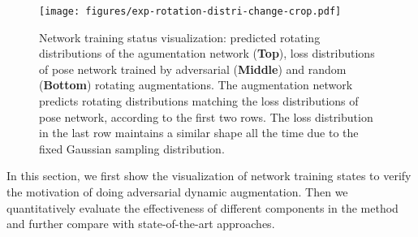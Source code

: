 \documentclass[10pt,twocolumn,letterpaper]{article}
\begin{document}
\begin{figure*}[t!]
\centering
\texttt{[image: figures/exp-rotation-distri-change-crop.pdf]}
\caption{Network training status visualization: predicted rotating distributions of the agumentation network ({\bf Top}), loss distributions of pose network trained by adversarial ({\bf Middle}) and random ({\bf Bottom}) rotating augmentations. The augmentation network predicts rotating distributions matching the loss distributions of pose network, according to the first two rows. The loss distribution in the last row maintains a similar shape all the time due to the fixed Gaussian sampling distribution.}
\label{fig:distri}
\end{figure*}%
In this section, we first show the visualization of network training states to verify the motivation of doing adversarial dynamic augmentation. Then we quantitatively evaluate the effectiveness of different components in the method and further compare with state-of-the-art approaches. 
\end{document}
